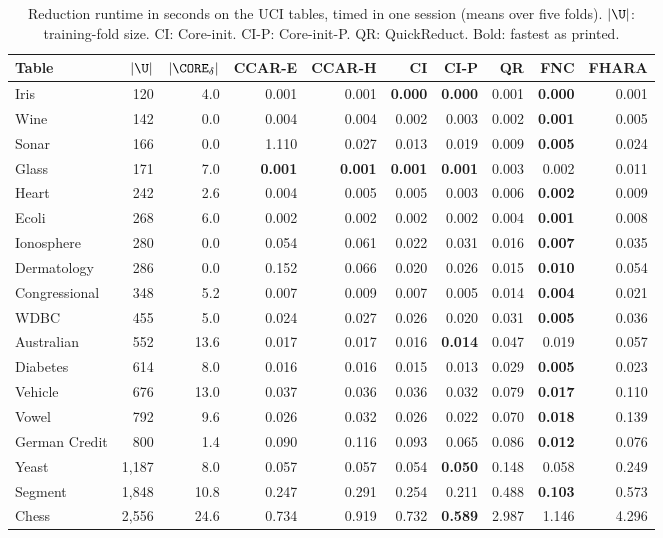 \begin{table}[!t]
  \caption{Reduction runtime in seconds on the UCI tables, timed in one session (means over five folds). $|\U|$: training-fold size. CI: Core-init. CI-P: Core-init-P. QR: QuickReduct. Bold: fastest as printed.}
  \label{tab:external}
  \footnotesize
  \setlength{\tabcolsep}{3pt}
  \begin{tabular*}{\textwidth}{@{\extracolsep{\fill}}lrrrrrrrrr@{}}
    \toprule
    Table & $|\U|$ & $|\CORE_\delta|$ & CCAR-E & CCAR-H & CI & CI-P & QR & FNC & FHARA \\
    \midrule
    Iris & 120 & 4.0 & 0.001 & 0.001 & \textbf{0.000} & \textbf{0.000} & 0.001 & \textbf{0.000} & 0.001 \\
    Wine & 142 & 0.0 & 0.004 & 0.004 & 0.002 & 0.003 & 0.002 & \textbf{0.001} & 0.005 \\
    Sonar & 166 & 0.0 & 1.110 & 0.027 & 0.013 & 0.019 & 0.009 & \textbf{0.005} & 0.024 \\
    Glass & 171 & 7.0 & \textbf{0.001} & \textbf{0.001} & \textbf{0.001} & \textbf{0.001} & 0.003 & 0.002 & 0.011 \\
    Heart & 242 & 2.6 & 0.004 & 0.005 & 0.005 & 0.003 & 0.006 & \textbf{0.002} & 0.009 \\
    Ecoli & 268 & 6.0 & 0.002 & 0.002 & 0.002 & 0.002 & 0.004 & \textbf{0.001} & 0.008 \\
    Ionosphere & 280 & 0.0 & 0.054 & 0.061 & 0.022 & 0.031 & 0.016 & \textbf{0.007} & 0.035 \\
    Dermatology & 286 & 0.0 & 0.152 & 0.066 & 0.020 & 0.026 & 0.015 & \textbf{0.010} & 0.054 \\
    Congressional & 348 & 5.2 & 0.007 & 0.009 & 0.007 & 0.005 & 0.014 & \textbf{0.004} & 0.021 \\
    WDBC & 455 & 5.0 & 0.024 & 0.027 & 0.026 & 0.020 & 0.031 & \textbf{0.005} & 0.036 \\
    Australian & 552 & 13.6 & 0.017 & 0.017 & 0.016 & \textbf{0.014} & 0.047 & 0.019 & 0.057 \\
    Diabetes & 614 & 8.0 & 0.016 & 0.016 & 0.015 & 0.013 & 0.029 & \textbf{0.005} & 0.023 \\
    Vehicle & 676 & 13.0 & 0.037 & 0.036 & 0.036 & 0.032 & 0.079 & \textbf{0.017} & 0.110 \\
    Vowel & 792 & 9.6 & 0.026 & 0.032 & 0.026 & 0.022 & 0.070 & \textbf{0.018} & 0.139 \\
    German Credit & 800 & 1.4 & 0.090 & 0.116 & 0.093 & 0.065 & 0.086 & \textbf{0.012} & 0.076 \\
    Yeast & 1{,}187 & 8.0 & 0.057 & 0.057 & 0.054 & \textbf{0.050} & 0.148 & 0.058 & 0.249 \\
    Segment & 1{,}848 & 10.8 & 0.247 & 0.291 & 0.254 & 0.211 & 0.488 & \textbf{0.103} & 0.573 \\
    Chess & 2{,}556 & 24.6 & 0.734 & 0.919 & 0.732 & \textbf{0.589} & 2.987 & 1.146 & 4.296 \\
    \bottomrule
  \end{tabular*}
\end{table}


